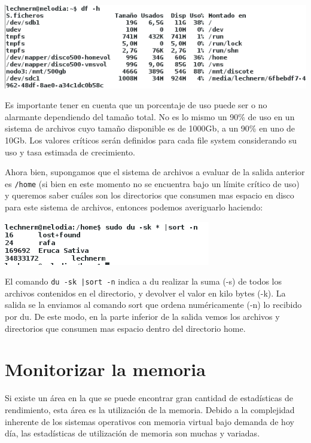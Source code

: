 \documentclass[12pt]{article}
\begin{document}
\begin{center}
 \includegraphics{df.png}
\end{center}

Es importante tener en cuenta que un porcentaje de uso puede ser o no
alarmante dependiendo del tamaño total. No es lo mismo un 90\% de uso en 
un sistema de archivos cuyo tamaño disponible es de 1000Gb, a un 90\% en 
uno de 10Gb. Los valores críticos serán definidos para cada file system 
considerando su uso y tasa estimada de crecimiento. 

Ahora bien, supongamos que el sistema de archivos a evaluar de la salida 
anterior es {\tt /home} (si bien en este momento no se encuentra bajo 
un límite crítico de uso)  y queremos saber cuáles son los directorios 
que consumen mas espacio en disco para este sistema de archivos, entonces
podemos averiguarlo haciendo: 

\begin{center}
 \includegraphics{du.png}
\end{center}

El comando {\tt du -sk |sort -n} indica a du realizar la suma (-s) de todos
los archivos contenidos en el directorio, y devolver el valor en kilo bytes
(-k). La salida se la enviamos al comando {sort} que ordena numéricamente 
(-n) lo recibido por du. De este modo, en la parte inferior de la salida 
vemos los archivos y directorios que consumen mas espacio dentro del 
directorio home. 

\section*{Monitorizar la memoria}
Si existe un área en la que se puede encontrar gran cantidad de 
estadísticas de rendimiento, esta área es la utilización de la memoria. 
Debido a la complejidad inherente de los sistemas operativos con memoria 
virtual bajo demanda de hoy día, las estadísticas de utilización de memoria
 son muchas y variadas. 
\end{document}
